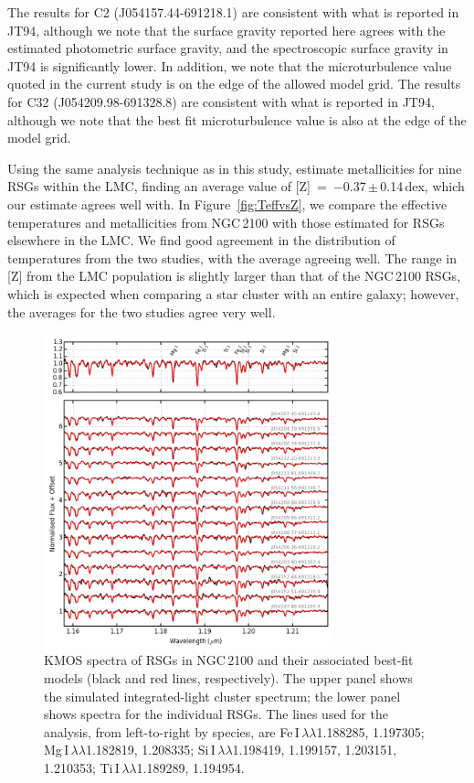 \documentclass[useAMS,usenatbib]{mn2e}
\begin{document}
The results for C2 (J054157.44-691218.1) are consistent with what is reported in JT94, although we note that the surface gravity reported here agrees with the estimated photometric surface gravity, and the spectroscopic surface gravity in JT94 is significantly lower.
In addition, we note that the microturbulence value quoted in the current study is on the edge of the allowed model grid.
The results for C32 (J054209.98-691328.8) are consistent with what is reported in JT94, although we note that the best fit microturbulence value is also at the edge of the model grid.


Using the same analysis technique as in this study,
\cite{2015ApJ...806...21D} estimate metallicities for nine RSGs within the LMC,
finding an average value of [Z]~=~$-$0.37\,$\pm$\,0.14\,dex, which our estimate agrees well with.
In Figure~\ref{fig:TeffvsZ}, we compare the effective temperatures and metallicities from NGC\,2100 with those estimated for RSGs elsewhere in the LMC.
We find good agreement in the distribution of temperatures from the two studies, with the average agreeing well.
The range in [Z] from the LMC population is slightly larger than that of the NGC\,2100 RSGs, which is expected when comparing a star cluster with an entire galaxy; however, the averages for the two studies agree very well.


\begin{figure}
 \begin{center}
\includegraphics[width=0.75\textwidth]{NGC2100-model-fits}
\caption{KMOS spectra of RSGs in NGC\,2100 and their associated best-fit models
(black and red lines, respectively).
The upper panel shows the simulated integrated-light cluster spectrum;
the lower panel shows spectra for the individual RSGs.
The lines used for the analysis, from left-to-right by species, are
Fe\,{\scriptsize I}$\,\lambda\lambda$1.188285,
1.197305;
Mg\,{\scriptsize I}$\,\lambda\lambda$1.182819,
1.208335;
Si\,{\scriptsize I}$\,\lambda\lambda$1.198419,
1.199157,
1.203151,
1.210353;
Ti\,{\scriptsize I}$\,\lambda\lambda$1.189289,
1.194954.\label{fig:model_fits}}
\end{center}
\end{figure}
\end{document}
